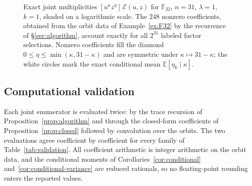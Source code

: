 \documentclass[10pt,a4paper]{article}
\newcommand{\F}{\mathbb F}
\newcommand{\Epoly}{\mathscr E}
\numberwithin{equation}{section}
\theoremstyle{plain}
\theoremstyle{definition}
\theoremstyle{remark}
\begin{document}
\begin{figure}[htbp]
\caption{Exact joint multiplicities $[u^{\kappa}z^{\eta}]\,\Epoly(u,z)$ for
$\F_{32}$, $n=31$, $\lambda=1$, $k=1$, shaded on a logarithmic scale. The $248$
nonzero coefficients, obtained from the orbit data of Example~\ref{ex:F32} by the
recurrence of \S\ref{sec:algorithm}, account exactly for all $2^{31}$ labeled
factor selections. Nonzero coefficients fill the diamond
$0\le\eta\le\min(\kappa,31-\kappa)$ and are symmetric under
$\kappa\mapsto31-\kappa$; the white circles mark the exact conditional mean
$\mathbb E[\eta_k\mid\kappa]$.}
\label{fig:joint}
\end{figure}

\subsection{Computational validation}\label{sec:verification}

Each joint enumerator is evaluated twice: by the trace recursion of
Proposition~\ref{prop:algorithm} and through the closed-form coefficients of
Proposition~\ref{prop:closed} followed by convolution over the orbits. The two
evaluations agree coefficient by coefficient for every family of
Table~\ref{tab:validation}. All coefficient arithmetic is integer arithmetic on
the orbit data, and the conditional moments of Corollaries~\ref{cor:conditional}
and~\ref{cor:conditional-variance} are reduced rationals, so no floating-point
rounding enters the reported values.
\end{document}

